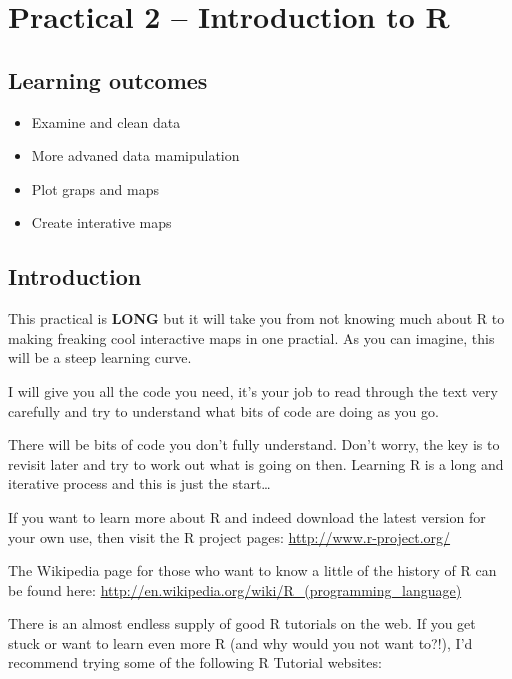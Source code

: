 \documentclass[]{book}
\providecommand{\tightlist}{%
  \setlength{\itemsep}{0pt}\setlength{\parskip}{0pt}}
\begin{document}
\hypertarget{practical-2-introduction-to-r}{%
\chapter{Practical 2 -- Introduction to R}\label{practical-2-introduction-to-r}}

\hypertarget{learning-outcomes-1}{%
\section{Learning outcomes}\label{learning-outcomes-1}}

\begin{itemize}
\tightlist
\item
  Examine and clean data
\item
  More advaned data mamipulation
\item
  Plot graps and maps
\item
  Create interative maps
\end{itemize}

\hypertarget{introduction-3}{%
\section{Introduction}\label{introduction-3}}

This practical is \textbf{LONG} but it will take you from not knowing much about R to making freaking cool interactive maps in one practial. As you can imagine, this will be a steep learning curve.

I will give you all the code you need, it's your job to read through the text very carefully and try to understand what bits of code are doing as you go.

There will be bits of code you don't fully understand. Don't worry, the key is to revisit later and try to work out what is going on then. Learning R is a long and iterative process and this is just the start\ldots{}

If you want to learn more about R and indeed download the latest version for your own use, then visit the R project pages: \url{http://www.r-project.org/}

The Wikipedia page for those who want to know a little of the history of R can be found here: \url{http://en.wikipedia.org/wiki/R_(programming_language)}

There is an almost endless supply of good R tutorials on the web. If you get stuck or want to learn even more R (and why would you not want to?!), I'd recommend trying some of the following R Tutorial websites:
\end{document}
